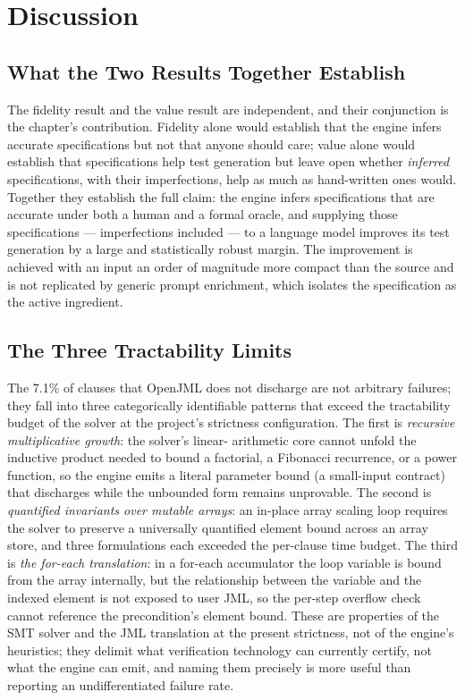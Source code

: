 \section{Discussion}
\label{sec:tg-discussion}

\subsection{What the Two Results Together Establish}

The fidelity result and the value result are independent, and their conjunction
is the chapter's contribution. Fidelity alone would establish that the engine
infers accurate specifications but not that anyone should care; value alone
would establish that specifications help test generation but leave open whether
\emph{inferred} specifications, with their imperfections, help as much as
hand-written ones would. Together they establish the full claim: the engine
infers specifications that are accurate under both a human and a formal oracle,
and supplying those specifications --- imperfections included --- to a language
model improves its test generation by a large and statistically robust margin.
The improvement is achieved with an input an order of magnitude more compact
than the source and is not replicated by generic prompt enrichment, which
isolates the specification as the active ingredient.

\subsection{The Three Tractability Limits}

The 7.1\% of clauses that OpenJML does not discharge are not arbitrary failures;
they fall into three categorically identifiable patterns that exceed the
tractability budget of the solver at the project's strictness configuration.
The first is \emph{recursive multiplicative growth}: the solver's linear-
arithmetic core cannot unfold the inductive product needed to bound a factorial,
a Fibonacci recurrence, or a power function, so the engine emits a literal
parameter bound (a small-input contract) that discharges while the unbounded
form remains unprovable. The second is \emph{quantified invariants over mutable
arrays}: an in-place array scaling loop requires the solver to preserve a
universally quantified element bound across an array store, and three
formulations each exceeded the per-clause time budget. The third is
\emph{the for-each translation}: in a for-each accumulator the loop variable is
bound from the array internally, but the relationship between the variable and
the indexed element is not exposed to user JML, so the per-step overflow check
cannot reference the precondition's element bound. These are properties of the
SMT solver and the JML translation at the present strictness, not of the
engine's heuristics; they delimit what verification technology can currently
certify, not what the engine can emit, and naming them precisely is more useful
than reporting an undifferentiated failure rate.

